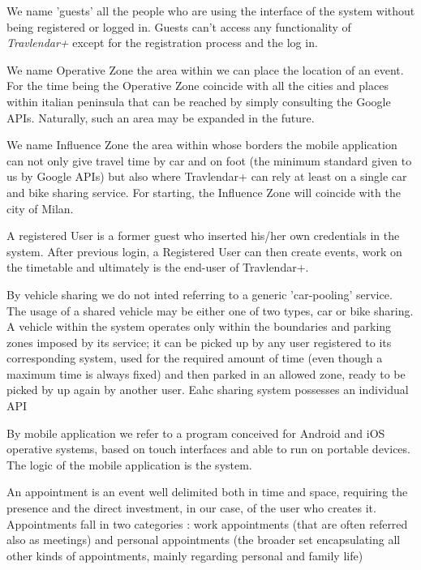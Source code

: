 \begin{description}
				\item[Guest] We name 'guests' all the people who are using the interface of the system without being registered or logged in. Guests can't access any functionality of \textit{Travlendar+} except for the registration process and the log in. 
				\item[Operative Zone] We name Operative Zone the area within we can place the location of an event. For the time being the Operative Zone coincide with all the cities and places within italian peninsula that can be reached by simply consulting the Google APIs. Naturally, such an area may be expanded in the future.
				\item[Influence Zone] We name Influence Zone the area within whose borders the mobile application can not only give travel time by car and on foot (the minimum standard given to us by Google APIs) but also where Travlendar+ can rely at least on a single car and bike sharing service. For starting, the Influence Zone will coincide with the city of Milan.
				\item
				\item[Registered User] A registered User is a former guest who inserted his/her own credentials in the system. After previous login, a Registered User can then create events, work on the timetable and ultimately is the end-user of Travlendar+.
				\item[Timetable]
				\item[Vehicle Sharing services/systems and a Shared Vehicle] By vehicle sharing we do not inted referring to a generic 'car-pooling' service. The usage of a shared vehicle may be either one of two types, car or bike sharing. A vehicle within the system operates only within the boundaries and parking zones imposed by its service; it can be picked up by any user registered to its corresponding system, used for the required amount of time (even though a maximum time is always fixed) and then parked in an allowed zone, ready to be picked by up again by another user. Eahc sharing system possesses an individual API			
				\item[Mobile Application] By mobile application we refer to a program conceived for Android and iOS operative systems, based on touch interfaces and able to run on portable devices. The logic of the mobile application is the system.
				\item[Appointment] An appointment is an event well delimited both in time and space, requiring the presence and the direct investment, in our case, of the user who creates it. Appointments fall in two categories : work appointments (that are often referred also as meetings) and personal appointments (the broader set encapsulating all other kinds of appointments, mainly regarding personal and family life)

\end{description}
